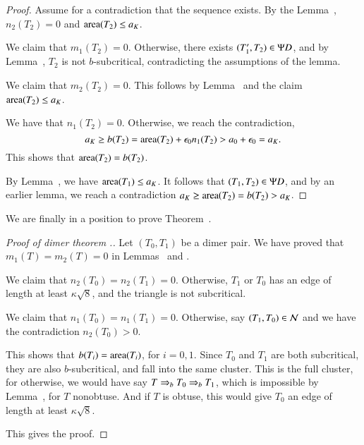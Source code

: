 \begin{proof}  Assume for a contradiction that the sequence exists.  
By the Lemma~, $n_2(T_2)=0$ and ${\operatorname{area}}(T_2)\le a_K$.

We claim that $m_1(T_2)=0$.  Otherwise, there exists $(T'_1,T_2)\in\Psi D$, and by Lemma~,
$T_2$ is not $b$-subcritical, contradicting the assumptions of the lemma.

We claim that $m_2(T_2)=0$.  This follows by Lemma~ and the claim ${\operatorname{area}}(T_2)\le a_K$.

We have that $n_1(T_2)=0$.  Otherwise, we reach the contradiction,
\[
a_K \ge b(T_2) ={\operatorname{area}}(T_2) + \epsilon_0 n_1(T_2) > a_0 + \epsilon_0 = a_K.
\]
This shows that ${\operatorname{area}}(T_2) = b(T_2)$.

By Lemma~, we have ${\operatorname{area}}(T_1)\le a_K$.
It follows that $(T_1,T_2)\in\Psi D$, and by an earlier lemma, 
we reach a contradiction $a_K \ge {\operatorname{area}}(T_2) = b(T_2) > a_K$.
\end{proof}
  
We are finally in a position to prove  Theorem~.

\begin{proof}[Proof of dimer theorem .]
Let $(T_0,T_1)$ be a dimer pair.   We have proved that $m_1(T)=m_2(T)=0$ in Lemmas~ and .

We claim that $n_2(T_0)=n_2(T_1)=0$.  Otherwise, $T_1$ or $T_0$ has an edge of length at least $\kappa\sqrt8$, and the triangle
is not subcritical.

We claim that $n_1(T_0)=n_1(T_1)=0$.  Otherwise, say $(T_1,T_0)\in\mathcal N$ and we have the contradiction $n_2(T_0)>0$.

This shows that $b(T_i)={\operatorname{area}}(T_i)$, for $i=0,1$.
Since $T_0$ and $T_1$ are both subcritical, they are also $b$-subcritical, and fall into the same cluster.
This is the full cluster, for otherwise, we would have say $T\Rightarrow_{b} T_0\Rightarrow_{b} T_1$, which is impossible by
Lemma~, for $T$ nonobtuse.  And if $T$ is obtuse, this would give $T_0$ an edge of length at least $\kappa\sqrt8$.

This gives the proof.
\end{proof}





